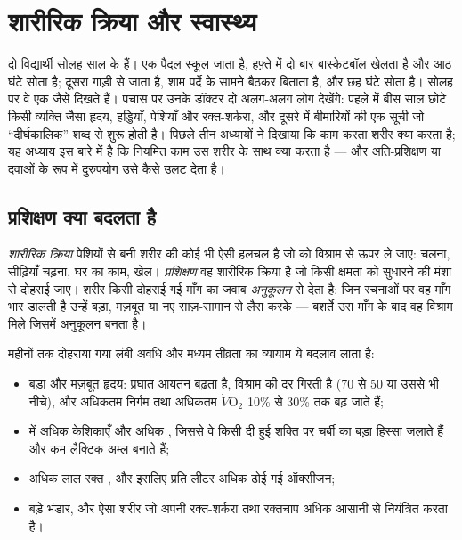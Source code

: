 \chapter{शारीरिक क्रिया और स्वास्थ्य}\label{ch:g10:sport-and-health}

दो विद्यार्थी सोलह साल के हैं। एक पैदल स्कूल जाता है, हफ़्ते में दो बार
बास्केटबॉल खेलता है और आठ घंटे सोता है; दूसरा गाड़ी से जाता है, शाम पर्दे
के सामने बैठकर बिताता है, और छह घंटे सोता है। सोलह पर वे एक जैसे दिखते
हैं। पचास पर उनके डॉक्टर दो अलग-अलग लोग देखेंगे: पहले में बीस साल छोटे
किसी व्यक्ति जैसा हृदय, हड्डियाँ, पेशियाँ और रक्त-शर्करा, और दूसरे में
बीमारियों की एक सूची जो ``दीर्घकालिक'' शब्द से शुरू होती है। पिछले तीन
अध्यायों ने दिखाया कि काम करता शरीर क्या करता है; यह अध्याय इस बारे में
है कि नियमित काम उस शरीर के साथ क्या करता है --- और अति-प्रशिक्षण या
दवाओं के रूप में दुरुपयोग उसे कैसे उलट देता है।

\section{प्रशिक्षण क्या बदलता है}

\begin{definition}[शारीरिक क्रिया और प्रशिक्षण]\label{def:g10:sport-and-health:training}
\emph{शारीरिक क्रिया} पेशियों से बनी शरीर की कोई
भी ऐसी हलचल है जो  को विश्राम से ऊपर ले जाए: चलना, सीढ़ियाँ
चढ़ना, घर का काम, खेल। \emph{प्रशिक्षण} वह शारीरिक क्रिया है जो किसी
क्षमता को सुधारने की मंशा से दोहराई जाए। शरीर किसी दोहराई गई माँग का
जवाब \emph{अनुकूलन} से देता है: जिन रचनाओं पर वह माँग भार डालती है
उन्हें बड़ा, मज़बूत या नए साज़-सामान से लैस करके --- बशर्ते उस माँग के
बाद वह विश्राम मिले जिसमें अनुकूलन बनता है।
\end{definition}

\begin{proposition}[सहनशक्ति के प्रशिक्षण से अनुकूलन]\label{prop:g10:sport-and-health:endurance}
महीनों तक दोहराया गया लंबी अवधि और मध्यम तीव्रता का व्यायाम ये बदलाव
लाता है:
\begin{itemize}
  \item बड़ा और मज़बूत हृदय: प्रघात आयतन बढ़ता है, विश्राम की दर गिरती है
        (70 से 50 या उससे भी नीचे), और अधिकतम निर्गम तथा अधिकतम
        $\dot V\!\mathrm{O_2}$ 10\% से 30\% तक बढ़ जाते हैं;
  \item {} में अधिक केशिकाएँ और अधिक , जिससे वे किसी
        दी हुई शक्ति पर चर्बी का बड़ा हिस्सा जलाते हैं और कम लैक्टिक अम्ल
        बनाते हैं;
  \item अधिक लाल रक्त , और इसलिए प्रति लीटर अधिक ढोई गई ऑक्सीजन;
  \item बड़े  भंडार, और ऐसा शरीर जो अपनी रक्त-शर्करा तथा
        रक्तचाप अधिक आसानी से नियंत्रित करता है।
\end{itemize}
\end{proposition}
\admitted


